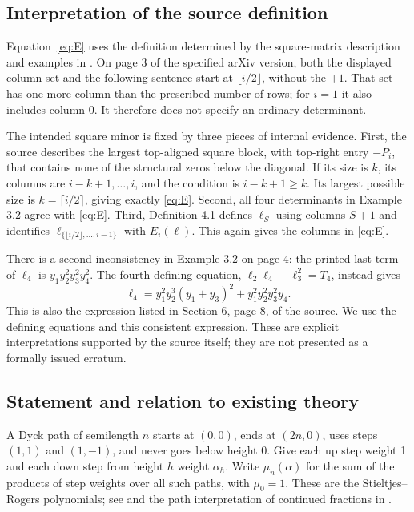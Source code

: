 \documentclass[11pt]{article}
\theoremstyle{remark}
\newcommand{\LH}{\ell}
\begin{document}
\subsection{Interpretation of the source definition}\label{sec:source}

Equation~\eqref{eq:E} uses the definition determined by the square-matrix
description and examples in \cite{Katthan}. On page 3 of the specified
arXiv version, both the displayed column set and the following sentence
start at $\lfloor i/2\rfloor$, without the $+1$. That set has one more
column than the prescribed number of rows; for $i=1$ it also includes
column 0. It therefore does not specify an ordinary determinant.

The intended square minor is fixed by three pieces of internal evidence.
First, the source describes the largest top-aligned square block, with
top-right entry $-P_i$, that contains none of the structural zeros below
the diagonal. If its size is $k$, its columns are $i-k+1,\ldots,i$, and
the condition is $i-k+1\ge k$. Its largest possible size is
$k=\lceil i/2\rceil$, giving exactly \eqref{eq:E}. Second, all four
determinants in Example 3.2 agree with \eqref{eq:E}. Third, Definition 4.1
defines $\LH_S$ using columns $S+1$ and identifies
$\LH_{\{\lfloor i/2\rfloor,\ldots,i-1\}}$ with $E_i(\LH)$.
This again gives the columns in \eqref{eq:E}.

There is a second inconsistency in Example 3.2 on page 4: the printed last
term of $\LH_4$ is $y_1y_2^2y_3^2y_4^2$. The fourth defining equation,
$\LH_2\LH_4-\LH_3^2=T_4$, instead gives
\begin{equation}\label{eq:ell4}
 \LH_4=y_1^2y_2^3(y_1+y_3)^2+y_1^2y_2^2y_3^2y_4.
\end{equation}
This is also the expression listed in Section 6, page 8, of the source.
We use the defining equations and this consistent expression. These are
explicit interpretations supported by the source itself; they are not
presented as a formally issued erratum.

\subsection{Statement and relation to existing theory}

A Dyck path of semilength $n$ starts at $(0,0)$, ends at $(2n,0)$, uses
steps $(1,1)$ and $(1,-1)$, and never goes below height 0. Give each up
step weight 1 and each down step from height $h$ weight $\alpha_h$. Write
$\mu_n(\alpha)$ for the sum of the products of step weights over all
such paths, with $\mu_0=1$. These are the Stieltjes--Rogers polynomials;
see \cite[Theorem 9.1(b)]{Sokal} and the path interpretation of continued
fractions in \cite{Flajolet}.
\end{document}
